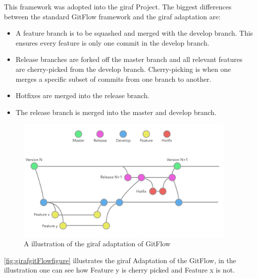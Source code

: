 This framework was adopted into the \gls{giraf} Project\cite{ProcessGitFlow}. The biggest differences between the standard GitFlow framework and the \gls{giraf} adaptation are:

\begin{itemize}
    \item A feature branch is to be squashed and merged with the develop branch. This ensures every feature is only one commit in the develop branch.
    \item Release branches are forked off the master branch and all relevant features are cherry-picked from the develop branch. Cherry-picking is when one merges a specific subset of commits from one branch to another.
    \item Hotfixes are merged into the release branch.
    \item The release branch is merged into the master and develop branch.
\end{itemize}
\begin{figure}[H]
        \begin{center}
            \includegraphics[width=0.95\textwidth]{figures/giraf_gitflow_illustration.pdf}
        \end{center}
        \caption{A illustration of the \gls{giraf} adaptation of GitFlow}
        \label{fig:girafgitFlowfigure}
\end{figure}
\autoref{fig:girafgitFlowfigure} illustrates the \gls{giraf} Adaptation of the GitFlow, in the illustration one can see how Feature y is cherry picked and Feature x is not.
